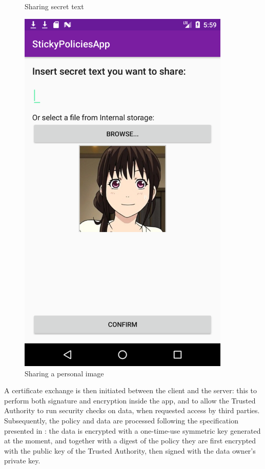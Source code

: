 \begin{figure}
\begin{minipage}{0.35\textwidth}
		\caption{Sharing secret text}
		\label{fig:share-text}
	\end{minipage}
	\begin{minipage}{0.35\textwidth}
		\centering
		\includegraphics[width=0.9\textwidth]{ShareData-image.png} %
		\caption{Sharing a personal image}
		\label{fig:share-img}
	\end{minipage}
\end{figure}


A certificate exchange is then initiated between the client and the server: this to perform both signature and encryption inside the app, and to allow the Trusted Authority to run security checks on data, when requested access by third parties. Subsequently, the policy and data are processed following the specification presented in \cite{pearson2011sticky}: the data is encrypted with a one-time-use symmetric key generated at the moment, and together with a digest of the policy they are first encrypted with the public key of the Trusted Authority, then signed with the data owner's private key.

